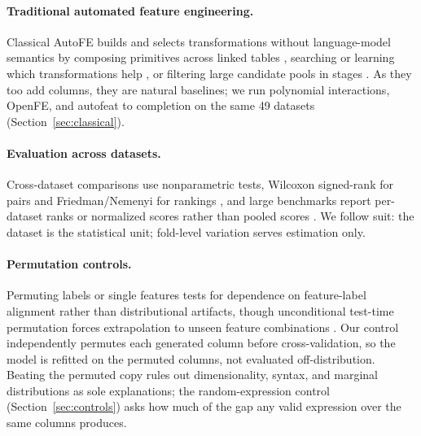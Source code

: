 \paragraph{Traditional automated feature engineering.}

Classical AutoFE builds and selects transformations without language-model semantics by composing primitives across linked tables \citep{kanter2015dfs}, searching or learning which transformations help \citep{khurana2016cognito,katz2016explorekit,nargesian2017lfe,khurana2018rl,zhu2022difer}, or filtering large candidate pools in stages \citep{horn2020autofeat,zhang2023openfe}. As they too add columns, they are natural baselines; we run polynomial interactions, OpenFE, and autofeat to completion on the same 49 datasets (Section~\ref{sec:classical}).

\paragraph{Evaluation across datasets.}

Cross-dataset comparisons use nonparametric tests, Wilcoxon signed-rank \citep{wilcoxon1945individual} for pairs and Friedman/Nemenyi \citep{friedman1937use} for rankings \citep{demsar2006statistical,garcia2010advanced}, and large benchmarks report per-dataset ranks or normalized scores rather than pooled scores \citep{grinsztajn2022tree,mcelfresh2023neural,erickson2025tabarena}. We follow suit: the dataset is the statistical unit; fold-level variation serves estimation only.

\paragraph{Permutation controls.}

Permuting labels \citep{ojala2010permutation} or single features \citep{breiman2001random,fisher2019all,altmann2010permutation,strobl2008conditional} tests for dependence on feature-label alignment rather than distributional artifacts, though unconditional test-time permutation forces extrapolation to unseen feature combinations \citep{hooker2021unrestricted}. Our control independently permutes each generated column before cross-validation, so the model is refitted on the permuted columns, not evaluated off-distribution. Beating the permuted copy rules out dimensionality, syntax, and marginal distributions as sole explanations; the random-expression control (Section~\ref{sec:controls}) asks how much of the gap any valid expression over the same columns produces.

